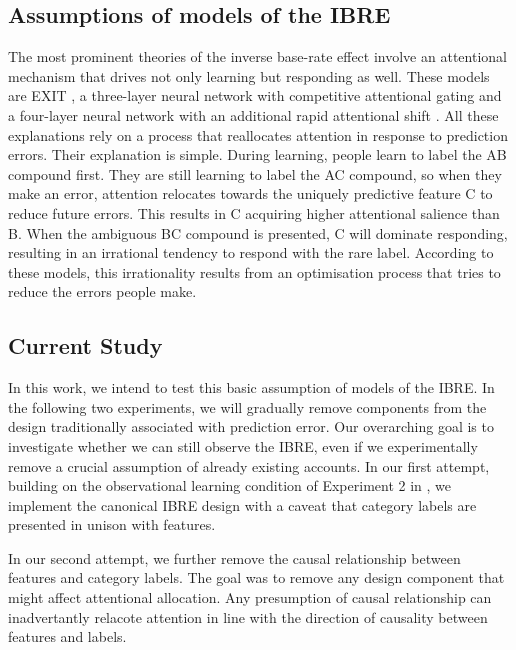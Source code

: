 \documentclass[10pt,letterpaper]{article}
\begin{document}
\subsection*{Assumptions of models of the IBRE}

The most prominent theories of the inverse base-rate effect involve an attentional mechanism that drives not only learning but responding as well.
These models are EXIT \cite{kruschke2001toward}, a three-layer neural network with competitive attentional gating and a four-layer neural network with an additional rapid attentional shift \cite{paskewitz2020dissecting}.
All these explanations rely on a process that reallocates attention in response to prediction errors.
Their explanation is simple.
During learning, people learn to label the AB compound first.
They are still learning to label the AC compound, so when they make an error, attention relocates towards the uniquely predictive feature C to reduce future errors.
This results in C acquiring higher attentional salience than B.
When the ambiguous BC compound is presented, C will dominate responding, resulting in an irrational tendency to respond with the rare label.
According to these models, this irrationality results from an optimisation process that tries to reduce the errors people make.

\subsection*{Current Study}

In this work, we intend to test this basic assumption of models of the IBRE.
In the following two experiments, we will gradually remove components from the design traditionally associated with prediction error.
Our overarching goal is to investigate whether we can still observe the IBRE, even if we experimentally remove a crucial assumption of already existing accounts.
In our first attempt, building on the observational learning condition of Experiment 2 in , we implement the canonical IBRE design with a caveat that category labels are presented in unison with features.

In our second attempt, we further remove the causal relationship between features and category labels.
The goal was to remove any design component that might affect attentional allocation.
Any presumption of causal relationship can inadvertantly relacote attention in line with the direction of causality between features and labels.
\end{document}
